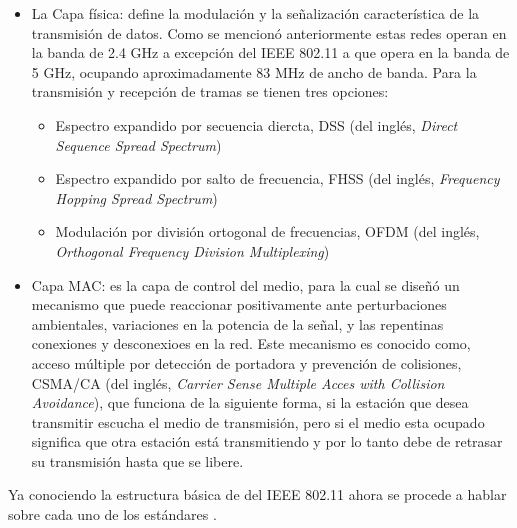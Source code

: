  \begin{itemize}
	\item La Capa física: define la modulación y la señalización característica de la transmisión de datos. Como se mencionó anteriormente estas redes operan en la banda de 2.4 GHz a excepción del IEEE 802.11 a que opera en la banda de 5 GHz, ocupando aproximadamente 83 MHz de ancho de banda. Para la transmisión y recepción de tramas se tienen tres opciones:
	\begin{itemize}
		\item Espectro expandido por secuencia diercta, DSS (del inglés, \textit{Direct Sequence Spread Spectrum})
		\item Espectro expandido por salto de frecuencia, FHSS (del inglés, \textit{ Frequency Hopping Spread Spectrum})
		\item Modulación por división ortogonal de frecuencias, OFDM (del inglés, \textit{Orthogonal Frequency Division 					Multiplexing})
	\end{itemize}	
	\item Capa MAC: es la capa de control del medio, para la cual se diseñó un mecanismo que puede reaccionar positivamente ante 		perturbaciones ambientales, variaciones en la potencia de la señal, y las repentinas conexiones y desconexioes en la red. Este 		mecanismo es conocido como, acceso múltiple por detección de portadora y prevención de colisiones, CSMA/CA (del inglés, \textit{Carrier Sense Multiple Acces with Collision Avoidance}), que funciona de la siguiente forma, si la estación que desea 			transmitir escucha el medio de transmisión, pero si el medio esta ocupado significa que otra estación está transmitiendo y por lo 		tanto debe de retrasar su transmisión hasta que se libere.
\end{itemize}

\par Ya conociendo la estructura básica de del IEEE 802.11 ahora se procede a hablar sobre cada uno de los estándares \cite{pellejero2006fundamentos}.

